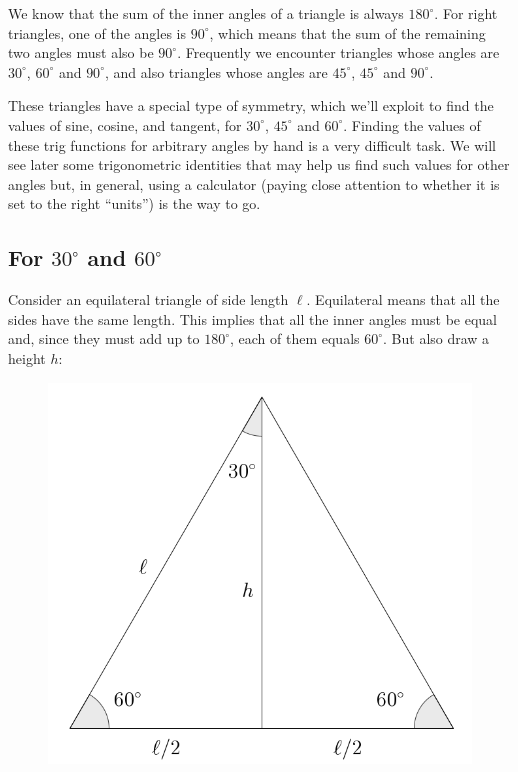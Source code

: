 \documentclass{ximera}
\begin{document}
We know that the sum of the inner angles of a triangle is always $180^\circ$. For right triangles, one of the angles is $90^\circ$, which means that the sum of the remaining two angles must also be $90^\circ$. Frequently we encounter triangles whose angles are $30^\circ$, $60^\circ$ and $90^\circ$, and also triangles whose angles are $45^\circ$, $45^\circ$ and $90^\circ$.

These triangles have a special type of symmetry, which we'll exploit to find the values of sine, cosine, and tangent, for $30^\circ$, $45^\circ$ and $60^\circ$. Finding the values of these trig functions for arbitrary angles by hand is a very difficult task. We will see later some trigonometric identities that may help us find such values for other angles but, in general, using a calculator (paying close attention to whether it is set to the right ``units'') is the way to go.

\subsection{For $30^\circ$ and $60^\circ$}

Consider an equilateral triangle of side length $\ell$. Equilateral means that all the sides have the same length. This implies that all the inner angles must be equal and, since they must add up to $180^\circ$, each of them equals $60^\circ$. But also draw a height $h$:

\begin{figure}[h]
  \centering
  \includegraphics[scale=.3]{./figures/9-1-1-triangle-30.png}
\end{figure}
\end{document}
